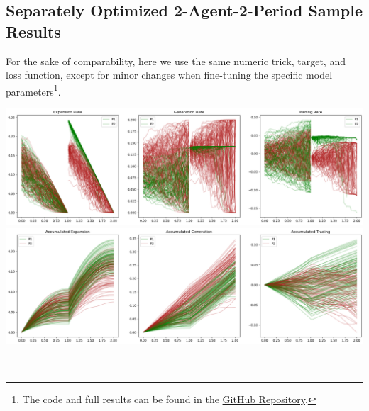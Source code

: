 \documentclass[a4paper,10pt]{article}
\newcommand{\1}{\mathbf{1}}
\begin{document}
\newpage  %

\subsection{Separately Optimized 2-Agent-2-Period Sample Results}

For the sake of comparability, here we use the same numeric trick, target, and loss function, except for minor changes when fine-tuning the specific model parameters\footnote{The code and full results can be found in the \href{https://github.com/OrangeAoo/PA-MFG-FBSDE/blob/FBSDE/2Period/Separate_Optim_1Prdx2/Adamax_clamp_sig_MSE.ipynb}{GitHub Repository}.}.

\begin{minipage}{\textwidth}
  \centering
  \begin{minipage}[h]{0.8\textwidth}
    \centering
    \includegraphics[]{FinalReports/Illustration_diagrams/Seprt-2A2P-Sigmoid-ResExamples/Rates.png}\\
    \includegraphics[]{FinalReports/Illustration_diagrams/Seprt-2A2P-Sigmoid-ResExamples/AccumRates.png}\\
    \label{fig:decomp-gen-sep}
  \end{minipage}\\
  \vspace{20pt}
  \begin{minipage}[h]{0.65\textwidth}
    \centering

\end{minipage}
\end{minipage}
\end{document}
